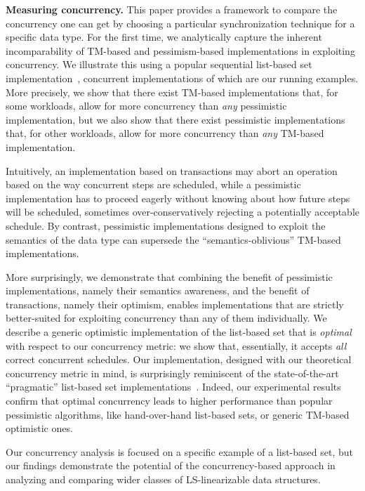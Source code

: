 \documentclass[11pt,pdftex,letterpaper]{article}
\begin{document}
\vspace{1mm}\noindent\textbf{Measuring concurrency.}
This paper provides 
a framework to compare the concurrency one can get
by choosing a particular synchronization technique for a specific data type.
For the first time, we analytically capture the
inherent incomparability of TM-based and pessimism-based
implementations in exploiting concurrency.
We illustrate this using a popular sequential list-based set
implementation~\cite{HS08-book}, concurrent implementations of which
are our running examples.
More precisely, we show that there exist TM-based implementations that, for some workloads, 
allow for more concurrency than \emph{any} pessimistic implementation,
but we also show that there exist pessimistic implementations that, for other workloads, allow for more 
concurrency than \emph{any} TM-based implementation.

Intuitively, an implementation based on transactions 
may abort an operation based on the way
concurrent steps are scheduled, 
while a pessimistic implementation 
has to proceed eagerly without knowing about how future steps will be 
scheduled, sometimes over-conservatively rejecting 
a potentially acceptable schedule.  
By contrast, pessimistic implementations designed to exploit
the semantics of the data type can supersede the
``semantics-oblivious'' TM-based implementations.


More surprisingly, we demonstrate that combining the benefit of pessimistic implementations, 
namely their semantics awareness, 
and the benefit 
of transactions,
namely their optimism, 
enables implementations that are strictly 
better-suited for exploiting concurrency 
than any of them individually.
We describe a generic optimistic implementation of 
the list-based set that is \emph{optimal} with respect to our
concurrency metric: we show that, essentially, it accepts \emph{all} 
correct concurrent schedules.
Our implementation, designed with our theoretical concurrency metric
in mind,  is surprisingly reminiscent of the
state-of-the-art ``pragmatic'' list-based set implementations~\cite{HHL+05,harris-set}. 
Indeed, our experimental results confirm
that optimal concurrency leads to higher performance
than popular pessimistic algorithms, like hand-over-hand list-based
sets, or generic TM-based optimistic ones.

Our concurrency analysis is focused on a specific example of a
list-based set, but our findings demonstrate the potential
of the concurrency-based  approach in analyzing and comparing wider classes of
LS-linearizable data structures. 
\end{document}
